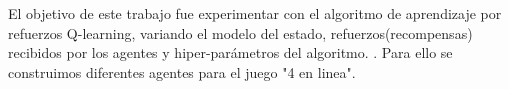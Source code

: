 
El objetivo de este trabajo fue experimentar con el algoritmo de aprendizaje por refuerzos Q-learning, variando el modelo del estado, refuerzos(recompensas) recibidos por los agentes y hiper-parámetros del algoritmo. . Para ello se  construimos diferentes agentes para el juego "4 en linea". 
